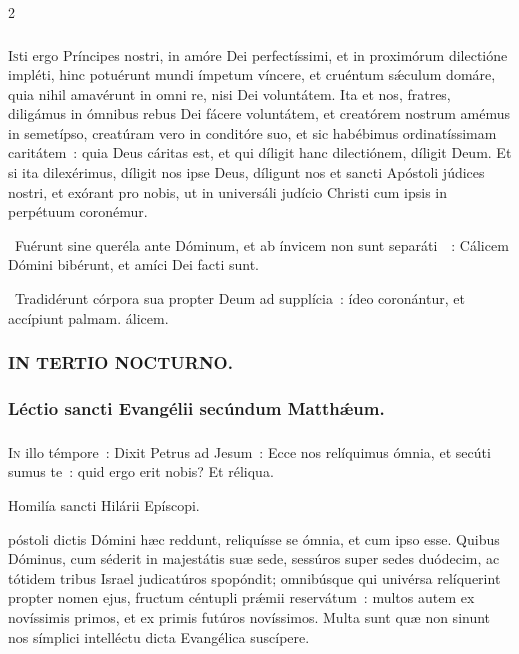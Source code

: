 \documentclass[9pt,twoside]{extarticle}
\begin{document}
\begin{multicols}{2}
{{\subsubsection*{\center {}}
\lettrine{I}sti ergo Príncipes nostri, in amóre Dei perfectíssimi, et in proximórum dilectióne impléti, hinc potuérunt mundi ímpetum víncere, et cruéntum sǽculum domáre, quia nihil amavérunt in omni re, nisi Dei voluntátem. Ita et nos, fratres, diligámus in ómnibus rebus Dei fácere voluntátem, et creatórem nostrum amémus in semetípso, creatúram vero in conditóre suo, et sic habébimus ordinatíssimam caritátem~: quia Deus cáritas est, et qui díligit hanc dilectiónem, díligit Deum. Et si ita dilexérimus, díligit nos ipse Deus, díligunt nos et sancti Apóstoli júdices nostri, et exórant pro nobis, ut in universáli judício Christi cum ipsis in perpétuum coronémur.

\begin{tightlist}{}
\item {}~Fuérunt sine queréla ante Dóminum, et ab ínvicem non sunt separáti~~: \textred{*} Cálicem Dómini bibérunt, et amíci Dei facti sunt.
\item {}~Tradidérunt córpora sua propter Deum ad supplícia~: ídeo coronántur, et accípiunt palmam. álicem.
\end{tightlist}

\subsubsection*{\center \textsc{IN TERTIO NOCTURNO.}}
\subsubsection*{\center Léctio sancti Evangélii secúndum Matthǽum.}
\subsubsection*{\center {}}
\lettrine{I}n illo témpore~: Dixit Petrus ad Jesum~: Ecce nos relíquimus ómnia, et secúti sumus te~: quid ergo erit nobis? Et réliqua.

\begin{center}Homilía sancti Hilárii Epíscopi.\\
\end{center}
póstoli dictis Dómini hæc reddunt, reliquísse se ómnia, et cum ipso esse. Quibus Dóminus, cum séderit in majestátis suæ sede, sessúros super sedes duódecim, ac tótidem tribus Israel judicatúros spopóndit; omnibúsque qui univérsa relíquerint propter nomen ejus, fructum céntupli prǽmii reservátum~: multos autem ex novíssimis primos, et ex primis futúros novíssimos. Multa sunt quæ non sinunt nos símplici intelléctu dicta Evangélica suscípere.

}}
\end{multicols}
\end{document}
